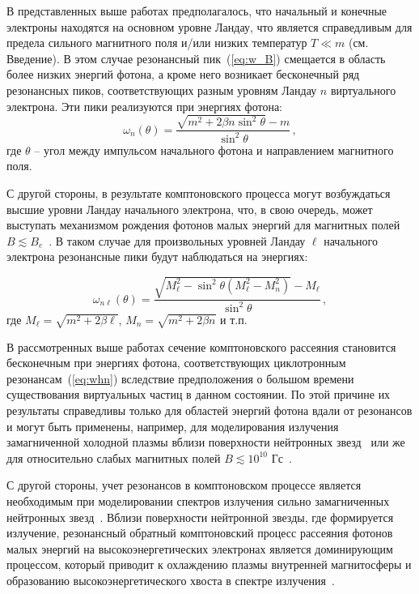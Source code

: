 В представленных выше работах предполагалось, что начальный и конечные электроны находятся 
на основном уровне Ландау, что является справедливым для предела сильного магнитного поля 
и/или низких температур $T\ll m$ (см. Введение). В этом случае резонансный 
пик~(\ref{eq:w_B})  смещается в область более низких энергий фотона, а кроме 
него возникает бесконечный ряд резонансных пиков, соответствующих разным 
уровням Ландау $n$ 
виртуального электрона. Эти пики реализуются при энергиях фотона:
\begin{equation}\label{eq:whn}
	\omega_n(\theta)= \frac{\sqrt{m^2+2 \beta n \sin^2\theta} - 
		m}{\sin^2\theta}\, ,
\end{equation}
где $\theta$ -- угол между импульсом начального фотона и направлением 
магнитного поля. 

С другой стороны, в результате комптоновского процесса могут возбуждаться 
высшие уровни Ландау начального электрона, что, в свою очередь, может выступать 
механизмом рождения фотонов малых энергий для магнитных полей $B\lesssim 
B_e$~\cite{Daugherty:1986,Bussard:1986}. В таком случае для произвольных уровней Ландау $\ell$ начального электрона резонансные 
пики будут наблюдаться на энергиях:

\begin{equation}\label{eq:resAll}
	\omega_{n\ell}(\theta)=\frac{\sqrt{M_\ell^2 - \sin^2\theta (M_\ell^2-M_n^2)}-M_\ell}{\sin^2\theta}\, ,
\end{equation}
где $M_\ell=\sqrt{m^2+2\beta \ell}$, $M_n=\sqrt{m^2+2\beta n}$ и т.п.

В рассмотренных выше работах сечение комптоновского рассеяния 
становится бесконечным при энергиях фотона, соответствующих циклотронным 
резонансам~(\ref{eq:whn}) вследствие предположения о 
большом времени существования виртуальных частиц в данном состоянии. По этой причине их результаты 
справедливы только для областей энергий фотона вдали от резонансов
и могут быть применены, например, для моделирования излучения 
замагниченной 
	холодной плазмы вблизи поверхности нейтронных 
	звезд~\cite{Ozel:2001} или же для относительно слабых магнитных 
	полей $B\lesssim 10^{10}$ Гс~\cite{Zavlin:1996}.

С другой стороны, учет резонансов в комптоновском процессе является необходимым 
при моделировании спектров излучения сильно замагниченных нейтронных 
звезд~\cite{Alexander:1991,Araya:1999,Ho:2001,Lyutikov:2006,Potekhin:2004,Schonherr:2007,Nishimura:2008,Suleimanov:2009}.
Вблизи поверхности нейтронной звезды, где формируется излучение, резонансный 
обратный комптоновский процесс рассеяния фотонов малых энергий на высокоэнергетических электронах 
является доминирующим процессом, который приводит к охлаждению плазмы 
внутренней магнитосферы и образованию высокоэнергетического хвоста в спектре 
излучения~\cite{Fernandez:2007,Nobili:2008,Baring:2018,Beloborodov:2013}.
%

